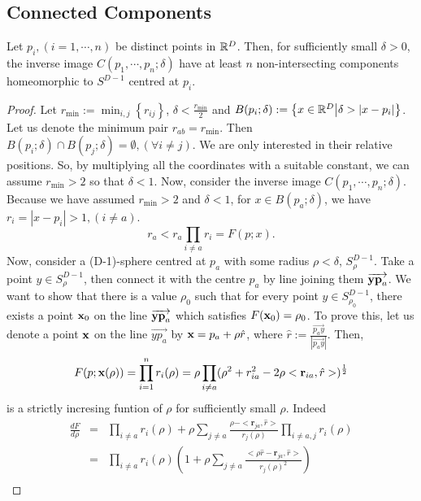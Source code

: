 \documentclass{article}
\begin{document}
\subsection{Connected Components}
\label{sec-1-6}
\begin{prop}
Let $p_i, (i=1,\cdots,n)$ be distinct points in $\mathbb R^D$. Then, for sufficiently small $\delta >0$, the inverse image $C(p_1,\cdots,p_n;\delta)$ have at least $n$ non-intersecting components homeomorphic to $S^{D-1}$ centred at $p_i$.
\end{prop}
\begin{proof}
Let $r_{\min}:= \min_{i,j}\left\{r_{ij}\right\}$, $\delta < \frac{r_{\min}}{2}$ and $B(p_i;\delta):= \left\{ {x\in \mathbb R^D} \big| {\delta >|x-p_i|} \right\}$. Let us denote the minimum pair $r_{ab}=r_{\min}$. Then $B(p_i;\delta)\cap B(p_j;\delta) = \emptyset, (\forall i\ne j)$.  We are only interested in their relative positions. So, by multiplying all the coordinates with a suitable constant, we can assume $r_{\min}>2$ so that $\delta <1$. Now, consider the inverse image $C(p_1,\cdots,p_n;\delta)$. Because we have assumed $r_{\min}>2$ and $\delta <1$, for $x\in B(p_a;\delta)$, we have $r_i = |x-p_i|>1, (i\ne a)$. 
\begin{equation}
\label{eq:inequality_radius}
r_a < r_a\prod_{i\ne a}r_i =F(p;x).
\end{equation}
Now, consider a (D-1)-sphere centred at $p_a$ with some radius $\rho < \delta$, $S^{D-1}_{\rho}$. Take a point $y \in S^{D-1}_{\rho}$, then connect it with the centre $p_a$ by line joining them $\overrightarrow{\textbf y \textbf p_a}$. We want to show that there is a value $\rho_0$ such that for every point $y \in S^{D-1}_{\rho_0}$, there exists a point $\textbf x_0$ on the line $\overrightarrow{\textbf y \textbf p_a}$ which satisfies $F(\textbf x_0)=\rho_0$. To prove this, let us denote a point $\textbf x$ on the line $\overrightarrow{yp_a}$ by $\textbf x = p_a + \rho \hat{r}$, where $\hat{r} := \frac{\overrightarrow{p_a y}}{|\overrightarrow{p_a y}|}$. Then, 
\begin{equation}
\label{}
F(p;\textbf x(\rho))=\prod_{i=1}^{n} r_i(\rho) = \rho \prod_{i \ne a } (\rho^2 + r^2_{ia} - 2\rho <\mathbf{r}_{ia},\hat{r}>)^{\frac{1}{2}}
\end{equation}
is a strictly incresing funtion of $\rho$ for sufficiently small $\rho$. Indeed
\begin{eqnarray}
\label{}
\frac{d F}{d \rho} &=& \prod_{i \ne a } r_i(\rho) + \rho \sum_{j\ne a } \frac{\rho -  <\mathbf{r}_{ja},\hat{r}>}{r_j(\rho)}\prod_{i \ne a,j } r_i(\rho)\nonumber\\
&=&\prod_{i \ne a } r_i(\rho) \left(1 + \rho\sum_{j\ne a } \frac{ <\rho\hat{r}-\mathbf{r}_{ja},\hat{r}>}{r_j(\rho)^2}\right)\nonumber\\

\end{eqnarray}
\end{proof}
\end{document}

